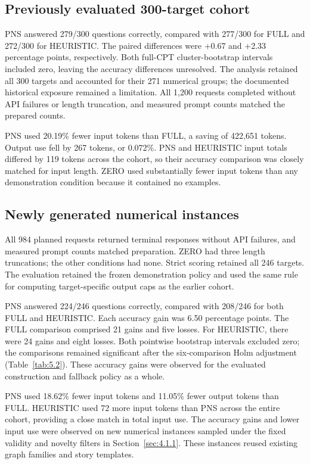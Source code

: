\subsection{Previously evaluated 300-target cohort}\label{sec:5.2.1}

PNS answered 279/300 questions correctly, compared with 277/300 for FULL and 272/300 for HEURISTIC. The paired differences were +0.67 and +2.33 percentage points, respectively. Both full-CPT cluster-bootstrap intervals included zero, leaving the accuracy differences unresolved. The analysis retained all 300 targets and accounted for their 271 numerical groups; the documented historical exposure remained a limitation. All 1,200 requests completed without API failures or length truncation, and measured prompt counts matched the prepared counts.

PNS used 20.19\% fewer input tokens than FULL, a saving of 422,651 tokens. Output use fell by 267 tokens, or 0.072\%. PNS and HEURISTIC input totals differed by 119 tokens across the cohort, so their accuracy comparison was closely matched for input length. ZERO used substantially fewer input tokens than any demonstration condition because it contained no examples.

\subsection{Newly generated numerical instances}\label{sec:5.2.2}

All 984 planned requests returned terminal responses without API failures, and measured prompt counts matched preparation. ZERO had three length truncations; the other conditions had none. Strict scoring retained all 246 targets. The evaluation retained the frozen demonstration policy and used the same rule for computing target-specific output caps as the earlier cohort.

PNS answered 224/246 questions correctly, compared with 208/246 for both FULL and HEURISTIC. Each accuracy gain was 6.50 percentage points. The FULL comparison comprised 21 gains and five losses. For HEURISTIC, there were 24 gains and eight losses. Both pointwise bootstrap intervals excluded zero; the comparisons remained significant after the six-comparison Holm adjustment (Table~\ref{tab:5.2}). These accuracy gains were observed for the evaluated construction and fallback policy as a whole.

PNS used 18.62\% fewer input tokens and 11.05\% fewer output tokens than FULL. HEURISTIC used 72 more input tokens than PNS across the entire cohort, providing a close match in total input use. The accuracy gains and lower input use were observed on new numerical instances sampled under the fixed validity and novelty filters in Section~\ref{sec:4.1.1}. These instances reused existing graph families and story templates.

